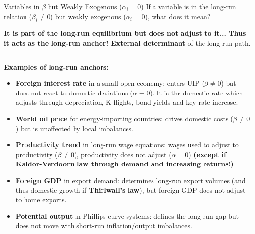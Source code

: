 \documentclass{beamer}
\begin{document}
\begin{frame}{Variables in $\beta$ but Weakly Exogenous ($\alpha_i=0$)}
\footnotesize
If a variable is in the long-run relation ($\beta_i \neq 0$) but weakly exogenous ($\alpha_i = 0$), what does it mean? 
\pause

\textbf{It is part of the long-run equilibrium but does not adjust to it... Thus it acts as the long-run anchor!} \textbf{External determinant} of the long-run path. 

\medskip
\hrule
\medskip

\textbf{Examples of long-run anchors:}
\begin{itemize}
  \item \textbf{Foreign interest rate} in a small open economy:  
        enters UIP ($\beta\neq 0$) but does not react to domestic deviations ($\alpha = 0$). It is the domestic rate which adjusts through depreciation, K flights, bond yields and key rate increase.
  \item \textbf{World oil price} for energy-importing countries:  
        drives domestic costs ($\beta\neq 0$) but is unaffected by local imbalances.
  \item \textbf{Productivity trend} in long-run wage equations:  wages used to adjust to productivity ($\beta\neq 0$), productivity does not adjust ($\alpha=0$)\textbf{ (except if Kaldor-Verdoorn law through demand and increasing returns!)}
  \item \textbf{Foreign GDP} in export demand: determines long-run export volumes (and thus domestic growth if\textbf{ Thirlwall's law}), but foreign GDP does not adjust to home exports.
  \item \textbf{Potential output} in Phillips-curve systems: defines the long-run gap but does not move with short-run inflation/output imbalances.
\end{itemize}

\end{frame}
\end{document}

